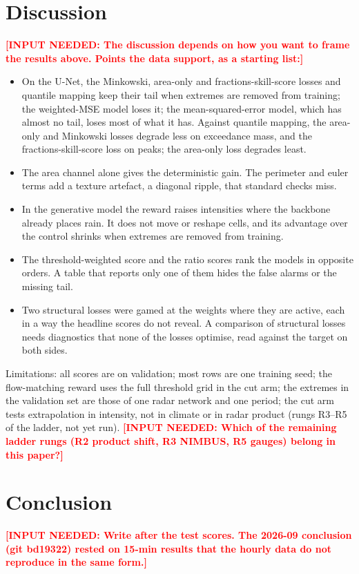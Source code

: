 \documentclass{article}
\newcommand{\needinput}[1]{\textcolor{red}{\textbf{[INPUT NEEDED: #1]}}}
\begin{document}
\section{Discussion}
\label{sec:disc}
\needinput{The discussion depends on how you want to frame the results above. Points the data support, as a starting
list:}
\begin{itemize}
  \item On the U-Net, the Minkowski, area-only and fractions-skill-score losses and quantile mapping keep their tail
  when extremes are removed from training; the weighted-MSE model loses it; the mean-squared-error model, which has
  almost no tail, loses most of what it has. Against quantile mapping, the area-only and Minkowski losses degrade
  less on exceedance mass, and the fractions-skill-score loss on peaks; the area-only loss degrades least.
  \item The area channel alone gives the deterministic gain. The perimeter and euler terms add a texture artefact, a
  diagonal ripple, that standard checks miss.
  \item In the generative model the reward raises intensities where the backbone already places rain. It does not
  move or reshape cells, and its advantage over the control shrinks when extremes are removed from training.
  \item The threshold-weighted score and the ratio scores rank the models in opposite orders. A table that reports
  only one of them hides the false alarms or the missing tail.
  \item Two structural losses were gamed at the weights where they are active, each in a way the headline scores do
  not reveal. A comparison of structural losses needs diagnostics that none of the losses optimise, read against the
  target on both sides.
\end{itemize}

Limitations: all scores are on validation; most rows are one training seed; the flow-matching reward uses the full
threshold grid in the cut arm; the extremes in the validation set are those of one radar network and one period;
the cut arm tests extrapolation in intensity, not in climate or in radar product (rungs R3--R5 of the ladder, not
yet run). \needinput{Which of the remaining ladder rungs (R2 product shift, R3 NIMBUS, R5 gauges) belong in this
paper?}

\section{Conclusion}
\needinput{Write after the test scores. The 2026-09 conclusion (git bd19322) rested on 15-min results that the hourly
data do not reproduce in the same form.}



\end{document}
